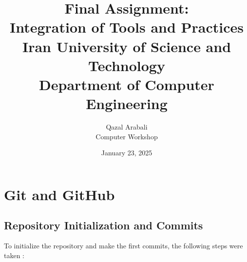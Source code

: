 \documentclass[12pt]{article}
\title{
    \vspace{2in}
    \textbf{Final Assignment:}\\
    \textbf{Integration of Tools and Practices}\\
    \large Iran University of Science and Technology\\
    \large Department of Computer Engineering\\
    \vspace{2in}
}
\author{
    \vspace{0.5in}
    Qazal Arabali\\
    Computer Workshop\\
    \vspace{0.5in}
}
\date{January 23, 2025}
\begin{document}
\begin{titlepage}
    \maketitle
    \thispagestyle{empty}
\end{titlepage}

\newpage

\tableofcontents
\newpage

\section{Git and GitHub}
    \subsection{Repository Initialization and Commits}
    
To initialize the repository and make the first commits, the following steps were taken :
\end{document}
